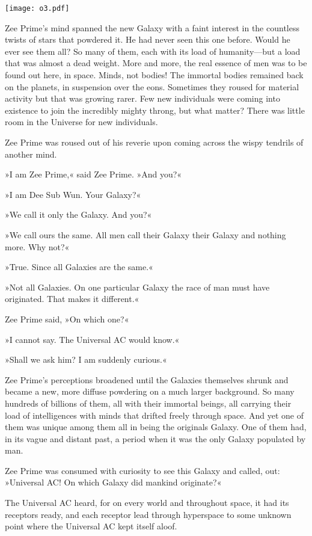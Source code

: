 \documentclass[11pt,twocolumn,paper=a5,pagesize]{article}
\newcommand{\q}[1]{»#1«}
\newcommand{\futurethree}[1]{ #1 }
\newcommand{\sepc}[0]{\vspace{.6cm} {\centering 

\texttt{[image: o3.pdf]}

}\vspace{.6cm}}
\newcommand{\initial}[1]{ \lettrine[lines=3,lhang=0.3,nindent=0em]{  {\textsf{#1}}}{}}
\begin{document}
\sepc{}

\futurethree{
\initial{Z}ee Prime's mind spanned the new Galaxy with a faint interest in the 
countless twists of stars that powdered it. He had never seen this one before. 
Would he ever see them all? So many of them, each with its load of 
humanity---but a load that was almost a dead weight. More and more, the real 
essence of men was to be found out here, in space.
Minds, not bodies! The immortal bodies remained back on the planets, in 
suspension over the eons. Sometimes they roused for material activity but that 
was growing rarer. Few new individuals were coming into existence to join the 
incredibly mighty throng, but what matter? There was little room in the 
Universe for new individuals.

Zee Prime was roused out of his reverie upon coming across the wispy tendrils 
of another mind.

\q{I am Zee Prime,} said Zee Prime. \q{And you?}

\q{I am Dee Sub Wun. Your Galaxy?}

\q{We call it only the Galaxy. And you?}

\q{We call ours the same. All men call their Galaxy their Galaxy and nothing 
more. Why not?}

\q{True. Since all Galaxies are the same.}

\q{Not all Galaxies. On one particular Galaxy the race of man must have 
originated. That makes it different.}

Zee Prime said, \q{On which one?}

\q{I cannot say. The Universal AC would know.}

\q{Shall we ask him? I am suddenly curious.}

Zee Prime's perceptions broadened until the Galaxies themselves shrunk and 
became a new, more diffuse powdering on a much larger background. So many 
hundreds of billions of them, all with their immortal beings, all carrying 
their load of intelligences with minds that drifted freely through space. 
And yet one of them was unique among them all in being the originals 
Galaxy. One of them had, in its vague and distant past, a period when it 
was the only Galaxy populated by man.

Zee Prime was consumed with curiosity to see this Galaxy and called, out: 
\q{Universal AC! On which Galaxy did mankind originate?}

The Universal AC heard, for on every world and throughout space, it had its 
receptors ready, and each receptor lead through hyperspace to some unknown 
point where the Universal AC kept itself aloof.

}
\end{document}

